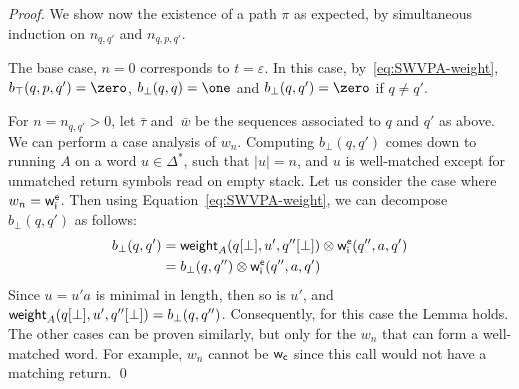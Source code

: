\begin{proof}
\noindent
We show now the existence of a path $\pi$ as expected, %
by simultaneous induction on $n_{q, q'}$ and $n_{q, p, q'}$.

\noindent
The base case, $n = 0$ corresponds to $t = \varepsilon$. 
In this case, by~\eqref{eq:SWVPA-weight}, $b_\top(q, p, q') = \zero$,
$b_\bot(q, q) = \one$ and $b_\bot(q, q') = \zero$ if $q \neq q'$.

\noindent
For $n = n_{q, q'} > 0$, let $\bar\tau$ and~$\bar{w}$
be the sequences associated to $q$ and $q'$ as above.
%
We can perform a case analysis of $w_n$.
Computing $b_\bot(q, q')$ comes down to running $A$ on a word $u \in \Delta^*$, 
such that $|u| = n$, and $u$ is well-matched except for unmatched return symbols
read on empty stack.
%
Let us consider the case where $w_n  = \weiei$. 
Then using Equation~\ref{eq:SWVPA-weight}, we can decompose $b_\bot(q, q')$ as follows:
\begin{align*}
b_\bot(q, q') &= \weight_A(\config{q}{\bot}, u', \config{q''}{\bot}) \otimes\weiei(q'', a, q') \\
&= b_\bot(q, q'')\otimes\weiei(q'', a, q')
\end{align*}
Since $u = u'a$ is minimal in length, then so is $u'$, 
and $\mathsf{weight}_A(q[{\bot}], u', q''[{\bot}]) = b_\bot(q, q'')$. 
Consequently, for this case the Lemma holds. 
The other cases can be proven similarly,  but only for the $w_n$ that can form a well-matched word. 
For example, $w_n$ cannot be ${\mathsf{w}_\mathsf{c}}$ since this call would not have a matching return.
\qed
\end{proof}